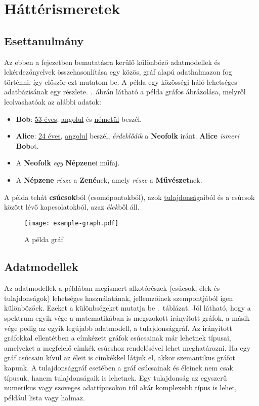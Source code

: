\chapter{Háttérismeretek}\label{sec:hatterismeretek}
\section{Esettanulmány}
Az ebben a fejezetben bemutatásra kerülő különböző adatmodellek és lekérdezőnyelvek összehasonlítása egy közös, gráf alapú adathalmazon fog történni, így először ezt mutatom be. A példa egy közösségi háló lehetséges adatbázisának egy részlete. .~ábrán látható a példa gráfos ábrázolása, melyről leolvashatóak az alábbi adatok:
\begin{itemize}
	\item \textbf{Bob}: \uline{53 éves}, \uline{angolul} és \uline{németül} beszél.
	\item \textbf{Alice}: \uline{24 éves}, \uline{angolul} beszél, \textit{érdeklődik} a \textbf{Neofolk} iránt. \textbf{Alice} \textit{ismeri} \textbf{Bob}ot.
	\item A \textbf{Neofolk} \textit{egy} \textbf{Népzene}i műfaj.
	\item A \textbf{Népzene} \textit{része} a \textbf{Zené}nek, amely \textit{része} a \textbf{Művészet}nek.
\end{itemize}
A példa tehát \textbf{csúcsok}ból (csomópontokból), azok \uline{tulajdonság}aiból és a csúcsok között lévő kapcsolatokból, azaz \textit{élek}ből áll.
\begin{figure}[h]
	\centering
	\texttt{[image: example-graph.pdf]}
	\caption{A példa gráf}
	\label{fig:example-graph}
\end{figure}
\section{Adatmodellek}
Az adatmodellek a példában megismert alkotórészek (csúcsok, élek és tulajdonságok) lehetséges használatának, jellemzőinek szempontjából igen különbözőek. Ezeket a különbségeket mutatja be .~táblázat. Jól látható, hogy a spektrum egyik vége a matematikában is megszokott irányított gráfok, a másik vége pedig az egyik legújabb adatmodell, a tulajdonsággráf. Az irányított gráfokkal ellentétben a címkézett gráfok csúcsainak már lehetnek típusai, amelyeket a megfelelő címkék csúcshoz rendelésével lehet meghatározni. Ha egy gráf csúcsain kívül az éleit is címkékkel látjuk el, akkor szemantikus gráfot kapunk. A tulajdonsággráf esetében a gráf csúcsainak és éleinek nem csak típusuk, hanem tulajdonságaik is lehetnek. Egy tulajdonság az egyszerű numerikus vagy szöveges adattípusokon túl akár komplexebb típus is lehet, például lista vagy halmaz.

